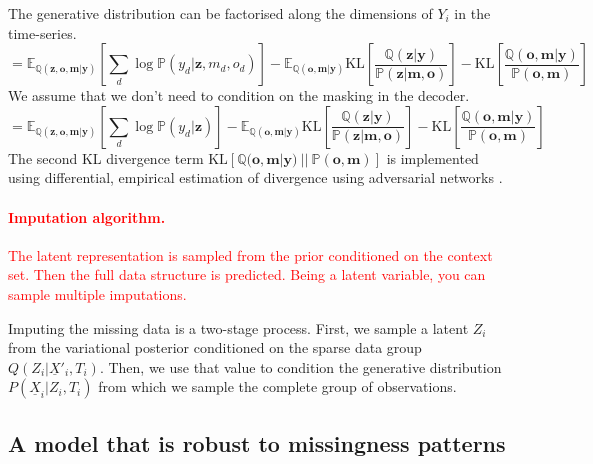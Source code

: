 \documentclass[a4paper,12pt,twoside,openright]{report}
\newcommand{\crit}[1]{\textcolor{red}{#1}}
\begin{document}
The generative distribution can be factorised along the dimensions of $Y_i$ in the time-series.
\begin{equation*}
    = \mathbb{E}_{\mathbb{Q}(\mathbf{z}, \mathbf{o}, \mathbf{m} | \mathbf{y})} \left[ \sum_{d} \log \mathbb{P}(y_d | \mathbf{z}, m_d, o_d) \right] - \mathbb{E}_{\mathbb{Q}(\mathbf{o}, \mathbf{m} | \mathbf{y})} \mathrm{KL} \left[ \frac{\mathbb{Q}(\mathbf{z} | \mathbf{y})}{\mathbb{P}(\mathbf{z} | \mathbf{m}, \mathbf{o})} \right] - \mathrm{KL} \left[ \frac{\mathbb{Q}(\mathbf{o}, \mathbf{m}| \mathbf{y})}{\mathbb{P}(\mathbf{o} , \mathbf{m})} \right]
\end{equation*}
We assume that we don't need to condition on the masking in the decoder.
\begin{equation*}
    = \mathbb{E}_{\mathbb{Q}(\mathbf{z}, \mathbf{o}, \mathbf{m} | \mathbf{y})} \left[ \sum_{d} \log \mathbb{P}(y_d | \mathbf{z}) \right] - \mathbb{E}_{\mathbb{Q}(\mathbf{o}, \mathbf{m} | \mathbf{y})} \mathrm{KL} \left[ \frac{\mathbb{Q}(\mathbf{z} | \mathbf{y})}{\mathbb{P}(\mathbf{z} | \mathbf{m}, \mathbf{o})} \right] - \mathrm{KL} \left[ \frac{\mathbb{Q}(\mathbf{o}, \mathbf{m}| \mathbf{y})}{\mathbb{P}(\mathbf{o} , \mathbf{m})} \right]
\end{equation*}
The second KL divergence term $\mathrm{KL} \left[ \mathbb{Q}(\mathbf{o}, \mathbf{m}| \mathbf{y}) ~||~ \mathbb{P}(\mathbf{o} , \mathbf{m}) \right]$ is implemented using differential, empirical estimation of divergence using adversarial networks \parencite{nowozinFGANTrainingGenerative2016,sreekumarNeuralEstimationStatistical2022}.

\crit{\paragraph{Imputation algorithm.} The latent representation is sampled from the prior conditioned on the context set. Then the full data structure is predicted. Being a latent variable, you can sample multiple imputations.}

Imputing the missing data is a two-stage process. First, we sample a latent $Z_i$ from the variational posterior conditioned on the sparse data group $Q(Z_i | \underline{X}'_i, T_i)$. Then, we use that value to condition the generative distribution $P(\underline{X}_i | Z_i, T_i)$ from which we sample the complete group of observations.

\subsection{A model that is robust to missingness patterns}
\end{document}
